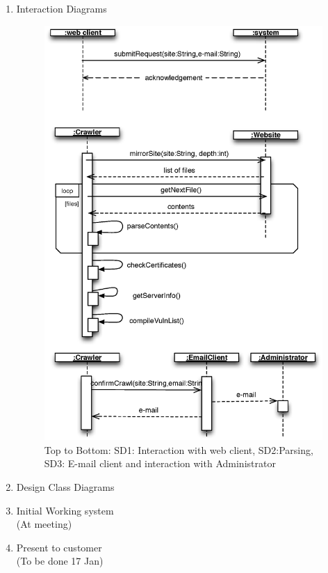 \documentclass{article}
\begin{document}
\begin{enumerate}
\newpage
\item Interaction Diagrams\\
\begin{figure}[H]
\includegraphics[width=.7\textwidth]{SDs}
\caption{Top to Bottom: SD1: Interaction with web client, SD2:Parsing, SD3: E-mail client and interaction with Administrator}
\end{figure}
\item Design Class Diagrams\\
\item Initial Working system\\ (At meeting)
\item Present to customer\\ (To be done 17 Jan)

\end{enumerate}
\end{document}
